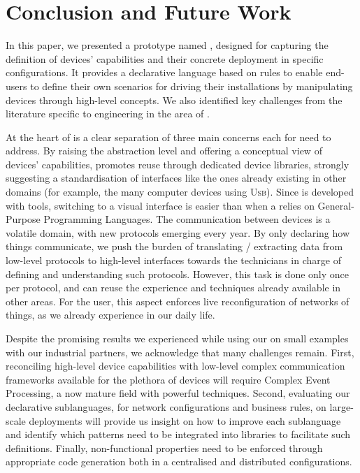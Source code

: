 \section{Conclusion and Future Work}

\label{sec:Conclusion}


In this paper, we presented a prototype \DSL named \IOTDSL, designed for capturing the definition of devices' capabilities and their concrete deployment in specific configurations. It provides a declarative language based on rules to enable end-users to define their own scenarios for driving their installations by manipulating devices through high-level concepts. We also identified key challenges from the literature specific to \DSL engineering in the area of \IOT. 


At the heart of \IOTDSL is a clear separation of three main concerns each \DSL for \IOT need to address. By raising the abstraction level and offering a conceptual view of devices' capabilities, \IOTDSL promotes reuse through dedicated device libraries, strongly suggesting a standardisation of interfaces like the ones already existing in other domains (for example, the many computer devices using \textsc{Usb}). Since \IOTDSL is developed with \MDE tools, switching to a visual interface is easier than when a \DSL relies on General-Purpose Programming Languages. The communication between devices is a volatile domain, with new protocols emerging every year. By only declaring how things communicate, we push the burden of translating / extracting data from low-level protocols to high-level interfaces towards the technicians in charge of defining and understanding such protocols. However, this task is done only once per protocol, and can reuse the experience and techniques already available in other areas. For the user, this aspect enforces live reconfiguration of networks of things, as we already experience in our daily life. 


Despite the promising results we experienced while using our \DSL on small examples with our industrial partners, we acknowledge that many challenges remain. First, reconciling high-level device capabilities with low-level complex communication frameworks available for the plethora of devices will require Complex Event Processing, a now mature field with powerful techniques. Second, evaluating our declarative sublanguages, for network configurations and business rules, on large-scale deployments will provide us insight on how to improve each sublanguage and identify which patterns need to be integrated into libraries to facilitate such definitions. Finally, non-functional properties need to be enforced through appropriate code generation both in a centralised and distributed configurations.




